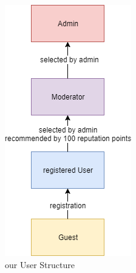 \begin{figure}[!tbp]
\begin{minipage}[b]{0.3\textwidth}
    \includegraphics[width=\textwidth]{Pictures/UserStructure}
    \caption{our User Structure}
  \end{minipage}
\end{figure}

